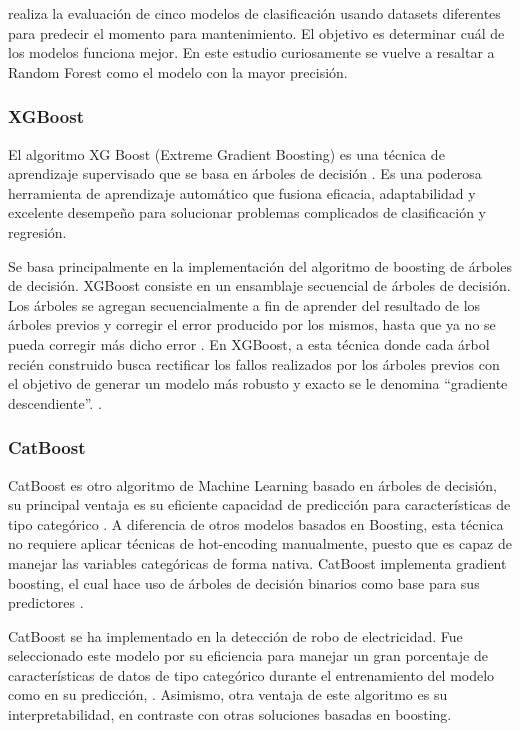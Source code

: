 \documentclass[11pt,a4paper,spanish]{book}
\numberwithin{equation}{chapter}
\numberwithin{figure}{chapter}
\begin{document}
\cite{sharma2022predictive} realiza la evaluación de cinco modelos de clasificación 
usando datasets diferentes para predecir el momento para mantenimiento. 
El objetivo es determinar cuál de los modelos funciona mejor. En este estudio 
curiosamente se vuelve a resaltar a Random Forest como el modelo con la mayor precisión.


\subsubsection{XGBoost}

El algoritmo XG Boost (Extreme Gradient Boosting) es una técnica de aprendizaje 
supervisado que se basa en árboles de decisión \cite{chen2016xgboost}. 
Es una poderosa herramienta de aprendizaje automático que fusiona eficacia, 
adaptabilidad y excelente desempeño para solucionar problemas complicados de 
clasificación y regresión. 


Se basa principalmente en la implementación del algoritmo de boosting de árboles de 
decisión. XGBoost consiste en un ensamblaje secuencial de árboles de decisión. 
Los árboles se agregan secuencialmente a fin de aprender del resultado de los árboles 
previos y corregir el error producido por los mismos, hasta que ya no se pueda corregir 
más dicho error \cite{salman2024rf}.  En XGBoost, a esta técnica donde cada árbol recién 
construido busca rectificar los fallos realizados por los árboles previos con el 
objetivo de generar un modelo más robusto y exacto se le denomina “gradiente 
descendiente”. \cite{espinoza2020rf_xgboost}.


\subsubsection{CatBoost}

CatBoost es otro algoritmo de Machine Learning basado en árboles de decisión, su 
principal ventaja es su eficiente capacidad de predicción para características de tipo 
categórico  \cite{ibrahim2020catboost}. A diferencia de otros modelos basados en 
Boosting, esta técnica no requiere aplicar técnicas de hot-encoding manualmente, 
puesto que es capaz de manejar las variables categóricas de forma nativa. CatBoost 
implementa gradient boosting, el cual hace uso de árboles de decisión binarios como 
base para sus predictores \cite{prokhorenkova2018catboost}.


CatBoost se ha implementado en la detección de robo de electricidad. Fue seleccionado 
este modelo por su eficiencia para manejar un gran porcentaje de características de 
datos de tipo categórico durante el entrenamiento del modelo como en su predicción, 
\cite{hussain2021catboost}. Asimismo, otra ventaja de este algoritmo es su 
interpretabilidad, en contraste con otras soluciones basadas en boosting. 
\end{document}
